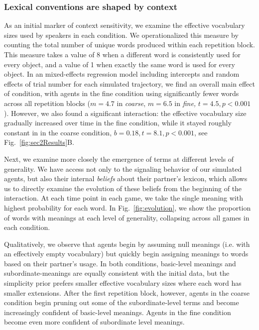 \subsubsection{Lexical conventions are shaped by context}

As an initial marker of context sensitivity, we examine the effective vocabulary sizes used by speakers in each condition.
We operationalized this measure by counting the total number of unique words produced within each repetition block.
This measure takes a value of 8 when a different word is consistently used for every object, and a value of 1 when exactly the same word is used for every object.
In an mixed-effects regression model including intercepts and random effects of trial number for each simulated trajectory, we find an overall main effect of condition, with agents in the fine condition using significantly fewer words across all repetition blocks ($m = 4.7$ in \emph{coarse}, $m=6.5$ in \emph{fine,} $t = 4.5, p < 0.001$).
However, we also found a significant interaction: the effective vocabulary size gradually increased over time in the fine condition, while it stayed roughly constant in in the coarse condition, $b = 0.18, t = 8.1, p < 0.001$, see Fig.~\ref{fig:sec2Results}B.

Next, we examine more closely the emergence of terms at different levels of generality.
We have access not only to the signaling behavior of our simulated agents, but also their internal \emph{beliefs} about their partner's lexicon, which allows us to directly examine the evolution of these beliefs from the beginning of the interaction.
At each time point in each game, we take the single meaning with highest probability for each word.
In Fig.~\ref{fig:evolution}, we show the proportion of words with meanings at each level of generality, collapsing across all games in each condition.


Qualitatively, we observe that agents begin by assuming null meanings (i.e. with an effectively empty vocabulary) but quickly begin assigning meanings to words based on their partner's usage.
In both conditions, basic-level meanings and subordinate-meanings are equally consistent with the initial data, but the simplicity prior prefers smaller effective vocabulary sizes where each word has smaller extensions.
After the first repetition block, however, agents in the coarse condition begin pruning out some of the subordinate-level terms and become increasingly confident of basic-level meanings.
Agents in the fine condition become even more confident of subordinate level meanings.

